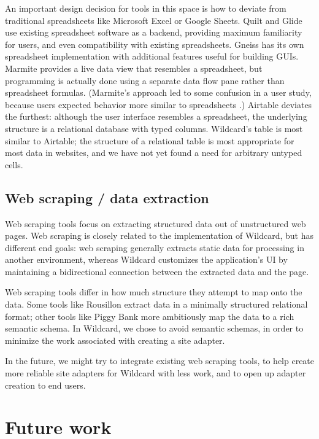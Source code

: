 \documentclass[english,submission]{programming}
\begin{document}
An important design decision for tools in this space is how to deviate
from traditional spreadsheets like Microsoft Excel or Google Sheets.
Quilt and Glide use existing spreadsheet software as a backend,
providing maximum familiarity for users, and even compatibility with
existing spreadsheets. Gneiss has its own spreadsheet implementation
with additional features useful for building GUIs. Marmite provides a
live data view that resembles a spreadsheet, but programming is actually
done using a separate data flow pane rather than spreadsheet formulas.
(Marmite's approach led to some confusion in a user study, because users
expected behavior more similar to spreadsheets \autocite{wong2007}.)
Airtable deviates the furthest: although the user interface resembles a
spreadsheet, the underlying structure is a relational database with
typed columns. Wildcard's table is most similar to Airtable; the
structure of a relational table is most appropriate for most data in
websites, and we have not yet found a need for arbitrary untyped cells.

\hypertarget{web-scraping-data-extraction}{%
\subsection{Web scraping / data
extraction}\label{web-scraping-data-extraction}}

Web scraping tools focus on extracting structured data out of
unstructured web pages. Web scraping is closely related to the
implementation of Wildcard, but has different end goals: web scraping
generally extracts static data for processing in another environment,
whereas Wildcard customizes the application's UI by maintaining a
bidirectional connection between the extracted data and the page.

Web scraping tools differ in how much structure they attempt to map onto
the data. Some tools like Rousillon \autocite{chasins2018} extract data
in a minimally structured relational format; other tools like Piggy Bank
\autocite{huynh2005} more ambitiously map the data to a rich semantic
schema. In Wildcard, we chose to avoid semantic schemas, in order to
minimize the work associated with creating a site adapter.

In the future, we might try to integrate existing web scraping tools, to
help create more reliable site adapters for Wildcard with less work, and
to open up adapter creation to end users.

\hypertarget{future-work}{%
\section{Future work}\label{future-work}}
\end{document}

